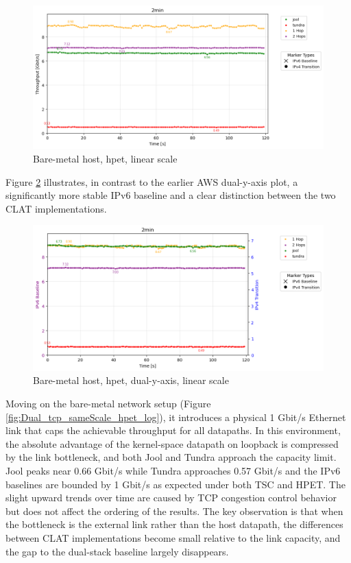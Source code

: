 \begin{figure}[H]
    \centering
    \includegraphics[width=1\textwidth]{resources/finalPlots/combinedplots/SingleLocal_tcp_sameScale_hpet_2min_linear.png}
    \caption{Bare-metal host, hpet, linear scale}
    \label{fig:Local_tcp_sameScale_hpet_linear}
\end{figure}

Figure \ref{fig:Local_tcp_dualAxis_hpet_linear} illustrates, in contrast to the earlier AWS dual-y-axis plot, a significantly more stable IPv6 baseline and a clear distinction between the two CLAT implementations.

\begin{figure}[H]
    \centering
    \includegraphics[width=1\textwidth]{resources/finalPlots/Jitterplots/LocalSingle_tcp_dualAxis_hpet_2min_linear.png}
    \caption{Bare-metal host, hpet, dual-y-axis, linear scale}
    \label{fig:Local_tcp_dualAxis_hpet_linear}
\end{figure}



Moving on the bare-metal network setup (Figure \ref{fig:Dual_tcp_sameScale_hpet_log}), it introduces a physical 1 Gbit/s Ethernet link that caps the achievable throughput for all datapaths. In this environment, the absolute advantage of the kernel-space datapath on loopback is compressed by the link bottleneck, and both Jool and Tundra approach the capacity limit. Jool peaks near 0.66 Gbit/s while Tundra approaches 0.57 Gbit/s and the IPv6 baselines are bounded by 1 Gbit/s as expected under both TSC and HPET. The slight upward trends over time are caused by TCP congestion control behavior\cite{rfc5681} but does not affect the ordering of the results. The key observation is that when the bottleneck is the external link rather than the host datapath, the differences between CLAT implementations become small relative to the link capacity, and the gap to the dual-stack baseline largely disappears.


